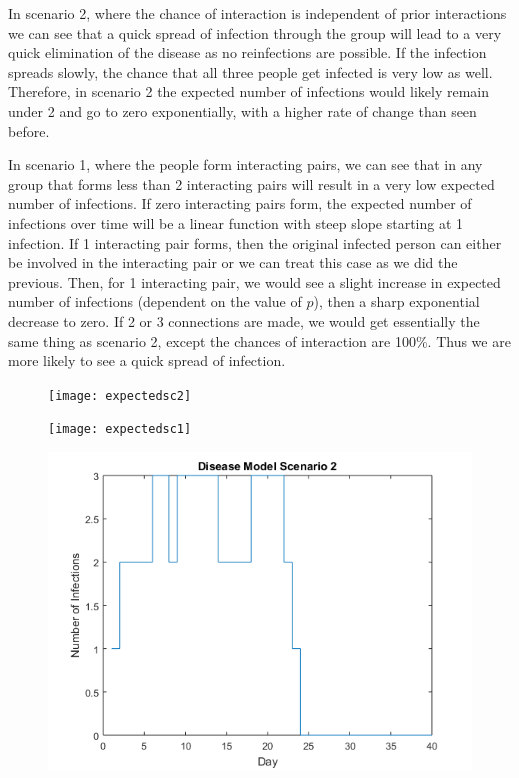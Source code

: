 \documentclass[12pt]{article}
\numberwithin{equation}{section}
\begin{document}
\begin{enumerate}
\begin{enumerate}
In scenario 2, where the chance of interaction is independent of prior interactions we can see that a quick spread of infection through the group will lead to a very quick elimination of the disease as no reinfections are possible. If the infection spreads slowly, the chance that all three people get infected is very low as well. Therefore, in scenario 2 the expected number of infections would likely remain under 2 and go to zero exponentially, with a higher rate of change than seen before. 

In scenario 1, where the people form interacting pairs, we can see that in any group that forms less than 2 interacting pairs will result in a very low expected number of infections. If zero interacting pairs form, the expected number of infections over time will be a linear function with steep slope starting at 1 infection. If 1 interacting pair forms, then the original infected person can either be involved in the interacting pair or we can treat this case as we did the previous. Then, for 1 interacting pair, we would see a slight increase in expected number of infections (dependent on the value of $p$), then a sharp exponential decrease to zero. If 2 or 3 connections are made, we would get essentially the same thing as scenario 2, except the chances of interaction are 100\%. Thus we are more likely to see a quick spread of infection.

  
\end{enumerate}
\end{enumerate}
\pagebreak
\begin{figure}[tp]
\texttt{[image: expectedsc2]}
\end{figure}
\begin{figure}[bp]
\texttt{[image: expectedsc1]}
\end{figure}
\pagebreak
\begin{figure}[tp]
\includegraphics{modelsc2a}
\end{figure}
\end{document}
